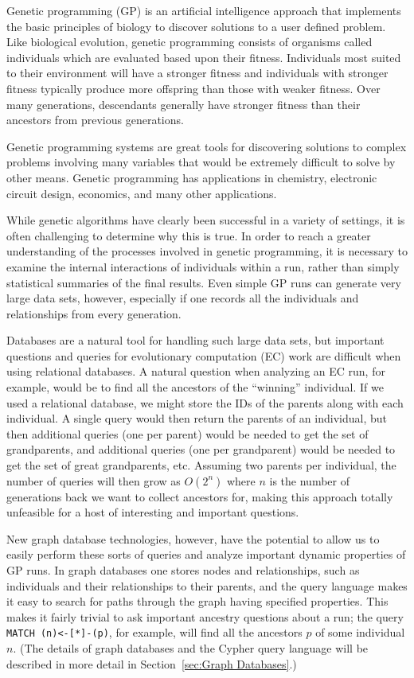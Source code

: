 \documentclass[12pt]{article}
\begin{document}
Genetic programming (GP) is an artificial intelligence approach that implements the basic principles of biology to discover solutions to a user defined problem. Like biological evolution, genetic programming consists of organisms called individuals which are evaluated based upon their fitness. Individuals most suited to their environment will have a stronger fitness and individuals with stronger fitness typically produce more offspring than those with weaker fitness. Over many generations, descendants generally have stronger fitness than their ancestors from previous generations.

Genetic programming systems are great tools for discovering solutions to complex problems involving many variables that would be extremely difficult to solve by other means. Genetic programming has applications in chemistry, electronic circuit design, economics, and many other applications. 

While genetic algorithms have clearly been successful in a variety of settings, it is often challenging to determine why this is true. In order to reach a greater understanding of the processes involved in genetic programming, it is necessary to examine the internal interactions of individuals within a run, rather than simply statistical summaries of the final results. Even simple GP runs can generate very large data sets, however, especially if one records all the individuals and relationships from every generation.

Databases are a natural tool for handling such large data sets, but important questions and queries for evolutionary computation (EC) work are difficult when using relational databases. A natural question when analyzing an EC run, for example, would be to find all the ancestors of the ``winning'' individual. If we used a relational database, we might store the IDs of the parents along with each individual. A single query would then return the parents of an individual, but then additional queries (one per parent) would be needed to get the set of grandparents, and additional queries (one per grandparent) would be needed to get the set of great grandparents, etc. Assuming two parents per individual, the number of queries will then grow as $O(2^n)$ where $n$ is the number of generations back we want to collect ancestors for, making this approach totally unfeasible for a host of interesting and important questions.

New graph database technologies, however, have the potential to allow us to easily perform these sorts of queries and analyze important dynamic properties of GP runs. In graph databases one stores nodes and relationships, such as individuals and their relationships to their parents, and the query language makes it easy to search for paths through the graph having specified properties. This makes it fairly trivial to ask important ancestry questions about a run; the query \texttt{MATCH (n)<-[*]-(p)}, for example, will find all the ancestors $p$ of some individual $n$. (The details of graph databases and the Cypher query language will be described in more detail in Section~\ref{sec:Graph Databases}.)
\end{document}
